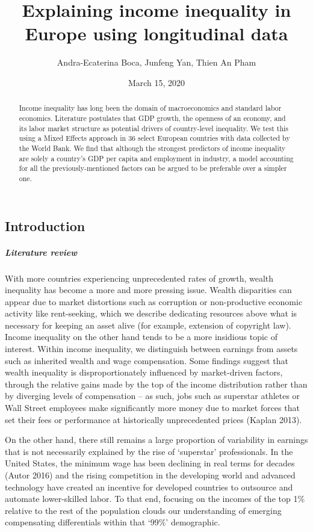 \documentclass[
]{article}
\title{Explaining income inequality in Europe using longitudinal data}
\author{Andra-Ecaterina Boca, Junfeng Yan, Thien An Pham}
\date{March 15, 2020}
\begin{document}
\maketitle
\begin{abstract}
Income inequality has long been the domain of macroeconomics and
standard labor economics. Literature postulates that GDP growth, the
openness of an economy, and its labor market structure as potential
drivers of country-level inequality. We test this using a Mixed Effects
approach in 36 select European countries with data collected by the
World Bank. We find that although the strongest predictors of income
inequality are solely a country's GDP per capita and employment in
industry, a model accounting for all the previously-mentioned factors
can be argued to be preferable over a simpler one.
\end{abstract}

\hypertarget{introduction}{%
\subsection{Introduction}\label{introduction}}

\hypertarget{literature-review}{%
\subparagraph{Literature review}\label{literature-review}}

With more countries experiencing unprecedented rates of growth, wealth
inequality has become a more and more pressing issue. Wealth disparities
can appear due to market distortions such as corruption or
non-productive economic activity like rent-seeking, which we describe
dedicating resources above what is necessary for keeping an asset alive
(for example, extension of copyright law). Income inequality on the
other hand tends to be a more insidious topic of interest. Within income
inequality, we distinguish between earnings from assets such as
inherited wealth and wage compensation. Some findings suggest that
wealth inequality is disproportionately influenced by market-driven
factors, through the relative gains made by the top of the income
distribution rather than by diverging levels of compensation -- as such,
jobs such as superstar athletes or Wall Street employees make
significantly more money due to market forces that set their fees or
performance at historically unprecedented prices (Kaplan 2013).

On the other hand, there still remains a large proportion of variability
in earnings that is not necessarily explained by the rise of `superstar'
professionals. In the United States, the minimum wage has been declining
in real terms for decades (Autor 2016) and the rising competition in the
developing world and advanced technology have created an incentive for
developed countries to outsource and automate lower-skilled labor. To
that end, focusing on the incomes of the top 1\% relative to the rest of
the population clouds our understanding of emerging compensating
differentials within that `99\%' demographic.
\end{document}
